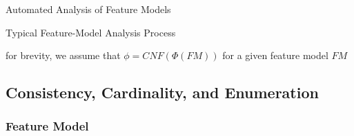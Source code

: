 \begin{frame}{Automated Analysis of Feature Models}
\begin{fancycolumns}[widths={52}]
\begin{definition}{Typical Feature-Model Analysis Process}
		\end{definition}
		\begin{note}{}
			for brevity, we assume that $\phi = CNF(\Phi(FM))$ for a given feature model $FM$
		\end{note}
	\end{fancycolumns}
\end{frame}


\subsection{Consistency, Cardinality, and Enumeration}

\subsubsection{Feature Model}

